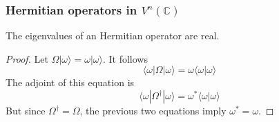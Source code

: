 \documentclass[11pt,fleqn]{book} %
\newcommand{\bra}[1]{\langle #1|}
\newcommand{\ket}[1]{| #1\rangle}
\newcommand{\scalar}[2]{\langle #1| #2\rangle}
\begin{document}
\subsubsection{Hermitian operators in $V^n(\mathbb{C})$}
\begin{theorem}
    The eigenvalues of an Hermitian operator are real.
\end{theorem}
\begin{proof}
    Let $\Omega\ket{\omega}=\omega\ket{\omega}$. It follows
    \begin{equation*}
        \bra{\omega}\Omega\ket{\omega}=\omega\scalar{\omega}{\omega}
    \end{equation*}
    The adjoint of this equation is
    \begin{equation*}
        \bra{\omega}\Omega^{\dagger}\ket{\omega}=\omega^*\scalar{\omega}{\omega}
    \end{equation*}
    But since $\Omega^{\dagger}=\Omega$, the previous two equations imply $\omega^*=\omega$.
\end{proof}
\end{document}
